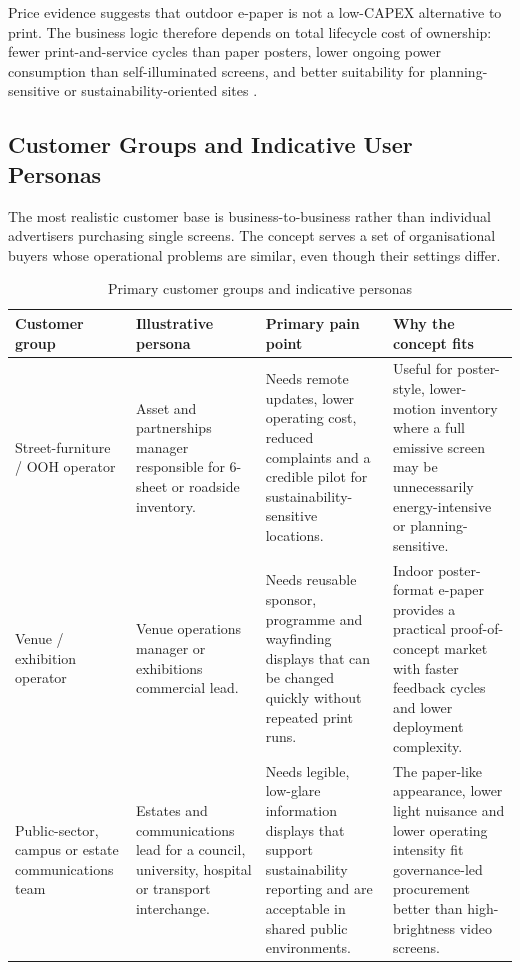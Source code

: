 \documentclass[11pt,a4paper]{article}
\renewcommand{\arraystretch}{1.12}
\begin{document}
Price evidence suggests that outdoor e-paper is not a low-CAPEX alternative to print. The business logic therefore depends on total lifecycle cost of ownership: fewer print-and-service cycles than paper posters, lower ongoing power consumption than self-illuminated screens, and better suitability for planning-sensitive or sustainability-oriented sites \cite{ref1,ref2,ref8,ref9}.

\subsection{Customer Groups and Indicative User Personas}

The most realistic customer base is business-to-business rather than individual advertisers purchasing single screens. The concept serves a set of organisational buyers whose operational problems are similar, even though their settings differ.

\begin{table}[H]
\centering
\caption{Primary customer groups and indicative personas}
\scriptsize
\renewcommand{\arraystretch}{1.08}
\begin{tabularx}{\textwidth}{L{3.0cm} L{3.0cm} Y Y}
\toprule
\textbf{Customer group} & \textbf{Illustrative persona} & \textbf{Primary pain point} & \textbf{Why the concept fits} \\
\midrule
Street-furniture / OOH operator & Asset and partnerships manager responsible for 6-sheet or roadside inventory. & Needs remote updates, lower operating cost, reduced complaints and a credible pilot for sustainability-sensitive locations. & Useful for poster-style, lower-motion inventory where a full emissive screen may be unnecessarily energy-intensive or planning-sensitive. \\
Venue / exhibition operator & Venue operations manager or exhibitions commercial lead. & Needs reusable sponsor, programme and wayfinding displays that can be changed quickly without repeated print runs. & Indoor poster-format e-paper provides a practical proof-of-concept market with faster feedback cycles and lower deployment complexity. \\
Public-sector, campus or estate communications team & Estates and communications lead for a council, university, hospital or transport interchange. & Needs legible, low-glare information displays that support sustainability reporting and are acceptable in shared public environments. & The paper-like appearance, lower light nuisance and lower operating intensity fit governance-led procurement better than high-brightness video screens. \\
\bottomrule
\end{tabularx}
\end{table}
\end{document}
